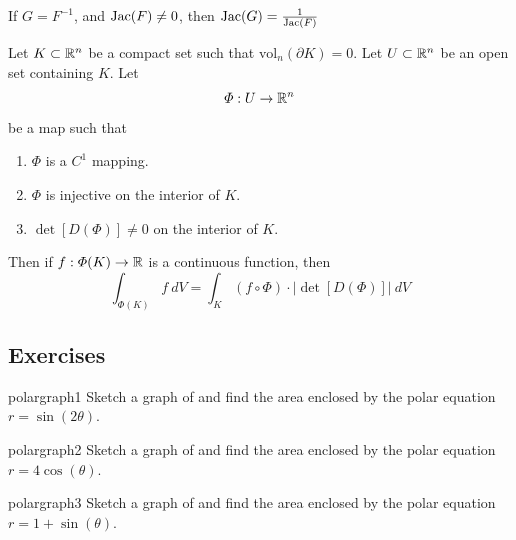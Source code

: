     
    \begin{theorem}
    If $G = F^{-1}$, and $\textnormal{Jac}(F) \neq 0$, then $\textnormal{Jac}(G) = \frac{1}{\textnormal{Jac}(F)}$
    \end{theorem}










    \begin{theorem}
    Let $K \subset \mathbb{R}^n$ be a compact set such that $\text{vol}_n(\partial K) = 0$.  Let $U \subset \mathbb{R}^n$ be an open set containing $K$. Let $$\Phi : U \to \mathbb{R}^n$$ be a map such that 
    \begin{enumerate}
        \item $\Phi$ is a $C^1$ mapping.
        \item $\Phi$ is injective on the interior of $K$.  
        \item $\det [D(\Phi)] \neq 0$ on the interior of $K$.  
    \end{enumerate}
    Then if $f: \Phi(K) \to \mathbb{R}$ is a continuous function, then 
    $$\int_{\Phi(K)} f \  dV = \int_K(f \circ \Phi) \cdot |\det [D(\Phi)]| \ dV$$
    \end{theorem}


    \subsection{Exercises}

    \begin{problem}{polargraph1}
    Sketch a graph of and find the area enclosed by the polar equation $r = \sin(2\theta)$.
    \end{problem}

    \begin{problem}{polargraph2}
    Sketch a graph of and find the area enclosed by the polar equation $r = 4\cos(\theta)$.
    \end{problem}

    \begin{problem}{polargraph3}
    Sketch a graph of and find the area enclosed by the polar equation $r = 1+\sin(\theta)$.
    \end{problem}

